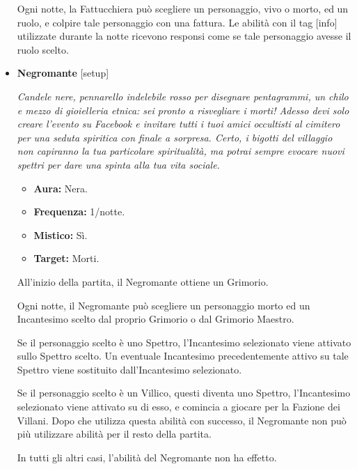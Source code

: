 \documentclass[a4paper,10pt]{article}
\begin{document}
\begin{itemize}
            Ogni notte, la Fattucchiera può scegliere un personaggio, vivo o morto, ed un ruolo, e colpire tale personaggio con una fattura. Le abilità con il tag [info] utilizzate durante la notte ricevono responsi come se tale personaggio avesse il ruolo scelto.

      \item \textbf{Negromante} [setup]

            \emph{Candele nere, pennarello indelebile rosso per disegnare pentagrammi, un chilo e mezzo di gioielleria etnica: sei pronto a risvegliare i morti! Adesso devi solo creare l'evento su Facebook e invitare tutti i tuoi amici occultisti al cimitero per una seduta spiritica con finale a sorpresa. Certo, i bigotti del villaggio non capiranno la tua particolare spiritualità, ma potrai sempre evocare nuovi spettri per dare una spinta alla tua vita sociale.}

            \begin{multicols}{2}
                  \begin{itemize}
                        \item \textbf{Aura:} Nera.
                        \item \textbf{Frequenza:} 1/notte.
                        \item \textbf{Mistico:} Sì.
                        \item \textbf{Target:} Morti.
                  \end{itemize}
            \end{multicols}

            All'inizio della partita, il Negromante ottiene un Grimorio.

            Ogni notte, il Negromante può scegliere un personaggio morto ed un Incantesimo scelto dal proprio Grimorio o dal Grimorio Maestro.

            Se il personaggio scelto è uno Spettro, l'Incantesimo selezionato viene attivato sullo Spettro scelto. Un eventuale Incantesimo precedentemente attivo su tale Spettro viene sostituito dall'Incantesimo selezionato.

            Se il personaggio scelto è un Villico, questi diventa uno Spettro, l'Incantesimo selezionato viene attivato su di esso, e comincia a giocare per la Fazione dei Villani. Dopo che utilizza questa abilità con successo, il Negromante non può più utilizzare abilità per il resto della partita.

            In tutti gli altri casi, l'abilità del Negromante non ha effetto.


\end{itemize}
\end{document}
